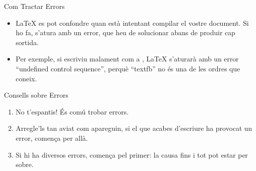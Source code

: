 \documentclass{beamer}
\begin{document}
\begin{frame}[fragile]{Com Tractar Errors}
\begin{itemize}
\item \LaTeX{} es pot confondre quan està intentant compilar el vostre document. 
    Si ho fa, s'atura amb un error, que heu de solucionar abans de produir cap sortida.
\item Per exemple, si escriviu malament  com a , \LaTeX{} s'aturarà amb un error 
``undefined control sequence'', perquè ``textfb'' no és una de les ordres que coneix.
\end{itemize}
\begin{block}{Consells sobre Errors}
\begin{enumerate}
\item No t'espantis! És comú trobar errors.
\item Arregle'ls tan aviat com apareguin, si el que acabes d'escriure ha provocat un error, comença per allà. 
\item Si hi ha diversos errors, comença pel primer:
la causa fins i tot pot estar per sobre.
\end{enumerate}
\end{block}
\end{frame}

\end{document}
